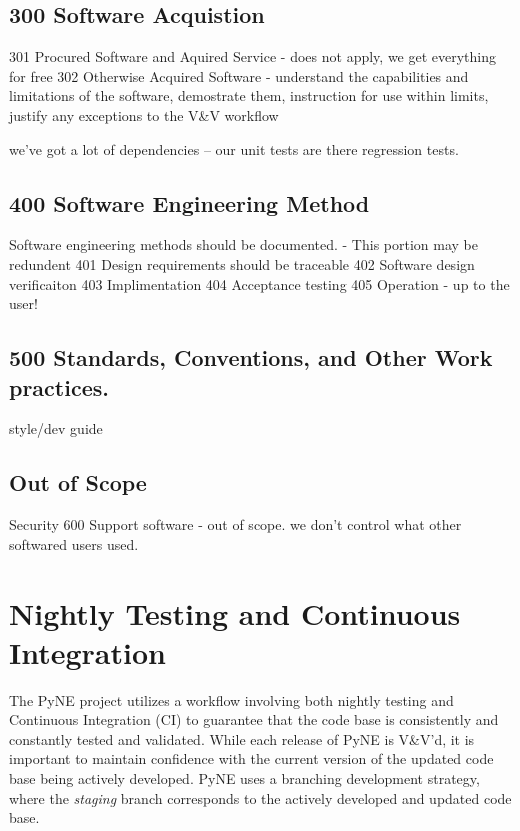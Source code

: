\documentclass{anstrans}
\begin{document}
\subsection{300 Software Acquistion}
301 Procured Software and Aquired Service - does not apply, we get everything for free
302 Otherwise Acquired Software - understand the capabilities and limitations of the software, demostrate them, instruction for use within limits, justify any exceptions to the V\&V workflow

we've got a lot of dependencies -- our unit tests are there regression tests.

\subsection{400 Software Engineering Method}
Software engineering methods should be documented.
- This portion may be redundent
401 Design requirements should be traceable
402 Software design verificaiton
403 Implimentation
404 Acceptance testing
405 Operation - up to the user!

\subsection{500 Standards, Conventions, and Other Work practices.}

style/dev guide


\subsection{Out of Scope}
Security
600 Support software - out of scope. we don't control what other softwared users used. 

\section{Nightly Testing and Continuous Integration}

The PyNE project utilizes a workflow involving both nightly testing and
Continuous Integration (CI) to guarantee that the code base is consistently and
constantly tested and validated. While each release of PyNE is V\&V'd, it is
important to maintain confidence with the current version of the updated code
base being actively developed. PyNE uses a branching development strategy, where
the \textit{staging} branch corresponds to the actively developed and updated
code base.
\end{document}
